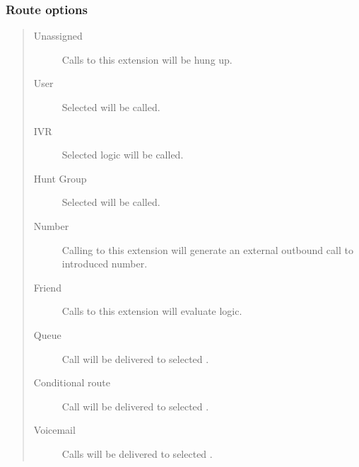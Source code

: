 \documentclass[letterpaper,10pt,english]{sphinxmanual}
\begin{document}
\subsubsection{Route options}
\label{administration_portal/client/vpbx/extensions:route-options}\begin{quote}
\begin{description}
\item[{Unassigned}] \leavevmode
Calls to this extension will be hung up.

\item[{User}] \leavevmode
Selected {\hyperref[administration_portal/client/vpbx/users:users]{}} will be called.

\item[{IVR}] \leavevmode
Selected {\hyperref[administration_portal/client/vpbx/routing_endpoints/ivrs:ivrs]{}} logic will be called.

\item[{Hunt Group}] \leavevmode
Selected {\hyperref[administration_portal/client/vpbx/routing_endpoints/hunt_groups:huntgroups]{}} will be called.

\item[{Number}] \leavevmode
Calling to this extension will generate an external outbound call
to introduced number.

\item[{Friend}] \leavevmode
Calls to this extension will evaluate {\hyperref[administration_portal/client/vpbx/routing_endpoints/friends/index:friends]{}} logic.

\item[{Queue}] \leavevmode
Call will be delivered to selected {\hyperref[administration_portal/client/vpbx/routing_endpoints/queues:queues]{}}.

\item[{Conditional route}] \leavevmode
Call will be delivered to selected {\hyperref[administration_portal/client/vpbx/routing_endpoints/conditional_routes:id1]{}}.

\item[{Voicemail}] \leavevmode
Calls will be delivered to selected {\hyperref[administration_portal/client/vpbx/voicemails:voicemails]{}}.

\end{description}
\end{quote}
\end{document}
